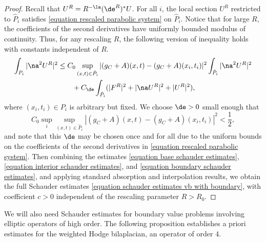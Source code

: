 \documentclass[hidelinks, 12pt, oneside, reqno]{amsart}
\begin{document}
\begin{proof}
    Recall that $U^R = R^{-\la}(\de^R)^*U$. For all $i$, the local section $U^R$ restricted to $\hat P_i$ satisfies \eqref{equation rescaled parabolic system} on $\hat P_i$. Notice that for large $R$, the coefficients of the second derivatives have uniformly bounded modulus of continuity. Thus, for any rescaling $R$, the following version of inequality \cite[(65)]{SchlagSchauder} holds with constants independent of $R$. 
    \begin{align}
        \int_{P_i} |\na^2 U^R|^2 &\le C_0 \sup_{(x,t) \in \hat P_i} |(g_C + A)(x,t)-(g_C + A)(x_i,t_i)|^2 \int_{\hat P_i} |\na^2 U^R|^2 \label{equation boundary schauder estimates}\\
        &\qquad + C_\de \int_{\hat P_i} (|F^R|^2 + |\na U^R|^2 + |U^R|^2),\nonumber
    \end{align}
    where $(x_i,t_i) \in P_i$ is arbitrary but fixed. We choose $\de >0$ small enough that \[
    C_0 \sup_i\sup_{(x,t) \in \hat P_i} |(g_C + A)(x,t)-(g_C + A)(x_i,t_i)|^2 < \frac12,\]
    and note that this $\de$ may be chosen once and for all due to the uniform bounds on the coefficients of the second derivatives in \eqref{equation rescaled parabolic system}. Then combining the estimates \eqref{equation base schauder estimates}, \eqref{equation interior schauder estimates}, and \eqref{equation boundary schauder estimates}, and applying standard absorption and interpolation results, we obtain the full Schauder estimates \eqref{equation schauder estimates vb with boundary}, with coefficient $c >0$ independent of the rescaling parameter $R > R_0$.
    \end{proof}


We will also need Schauder estimates for boundary value problems involving elliptic operators of high order. The following proposition establishes a priori estimates for the weighted Hodge bilaplacian, an operator of order 4. 
\end{document}
